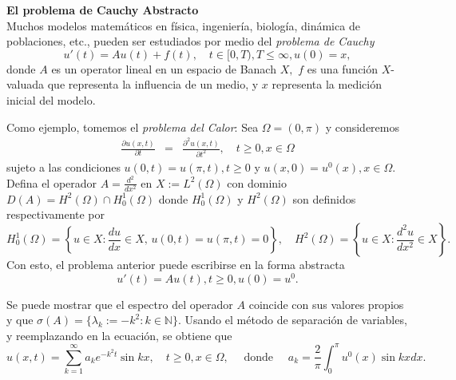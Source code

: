 \begin{titlepage}
\begin{minipage}{0.85\linewidth}
%
%    
\end{minipage}\vspace{10pt}
\begin{minipage}{0.5\linewidth}
\end{minipage}\hspace{-3pt}
\begin{minipage}{0.85\linewidth}
\footnotesize
{\centering\bf\large El problema de Cauchy Abstracto}\\

Muchos modelos matem\'aticos en f\'isica, ingenier\'ia, biolog\'ia, din\'amica de poblaciones, etc., pueden ser estudiados por medio del {\em problema de Cauchy}
$$u'(t)=Au(t)+f(t), \quad t \in [0, T), T\leq \infty, u(0) = x,$$
donde $A$ es un operator lineal en un espacio de Banach $X,$ $f$ es una funci\'on $X$-valuada que representa la influencia de un medio, y $x$ representa la medici\'on inicial del modelo.

Como ejemplo, tomemos el {\em problema del Calor}: Sea $\Omega=(0,\pi)$ y consideremos 
\begin{eqnarray*}
\frac{\partial u(x,t)}{\partial t}&=&\frac{\partial^2 u(x,t)}{\partial t^2}, \quad t\geq 0, x\in \Omega
\end{eqnarray*}
sujeto a las condiciones $u(0,t)=u(\pi,t), t\geq 0$ y $u(x,0)=u^0(x), x\in \Omega.$ Defina el operador $A=\frac{d^2}{dx^2}$ en $X:=L^2(\Omega)$ con dominio $D(A)=H^2(\Omega)\cap H^1_0(\Omega)$ donde $H^1_0(\Omega)$ y $H^2(\Omega)$ son definidos respectivamente por
$$H^1_0(\Omega)=\left\{u\in X: \frac{d u}{dx}\in X,\, u(0,t)=u(\pi,t)=0\right\}, \quad H^2(\Omega)=\left\{u\in X: \frac{d^2 u}{dx^2}\in X\right\}.$$
Con esto, el problema anterior puede escribirse en la forma abstracta
\begin{equation}\label{eq0-1}
u'(t)=Au(t), t\geq 0, u(0)=u^0.
\end{equation}

Se puede mostrar que el espectro del operador $A$ coincide con sus valores propios y que $\sigma(A)=\{\lambda_k:=-k^2 : k\in \mathbb{N}\}.$ Usando el m\'etodo de separaci\'on de variables, y reemplazando en la ecuaci\'on, se obtiene que
$$u(x,t)=\sum_{k=1}^\infty a_ke^{-k^2t}\sin kx, \quad t\geq 0, x\in\Omega, \quad \mbox{ donde } \quad a_k=\frac{2}{\pi}\int_0^\pi u^0(x)\sin kx dx.$$



\end{minipage}
\end{titlepage}
